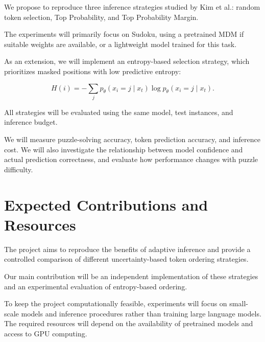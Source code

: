 \documentclass{article}
\begin{document}
We propose to reproduce three inference strategies studied
by Kim et al.: random token selection, Top Probability,
and Top Probability Margin.

The experiments will primarily focus on Sudoku, using
a pretrained MDM if suitable weights are available,
or a lightweight model trained for this task.

As an extension, we will implement an entropy-based
selection strategy, which prioritizes masked positions
with low predictive entropy:

\begin{equation}
    H(i) = -\sum_j p_\theta(x_i=j \mid x_t)
    \log p_\theta(x_i=j \mid x_t).
\end{equation}

All strategies will be evaluated using the same model,
test instances, and inference budget.

We will measure puzzle-solving accuracy, token prediction
accuracy, and inference cost. We will also investigate
the relationship between model confidence and actual
prediction correctness, and evaluate how performance
changes with puzzle difficulty.

\section{Expected Contributions and Resources}

The project aims to reproduce the benefits of adaptive
inference and provide a controlled comparison of different
uncertainty-based token ordering strategies.

Our main contribution will be an independent implementation
of these strategies and an experimental evaluation of
entropy-based ordering.

To keep the project computationally feasible, experiments
will focus on small-scale models and inference procedures
rather than training large language models. The required
resources will depend on the availability of pretrained
models and access to GPU computing.



\end{document}
